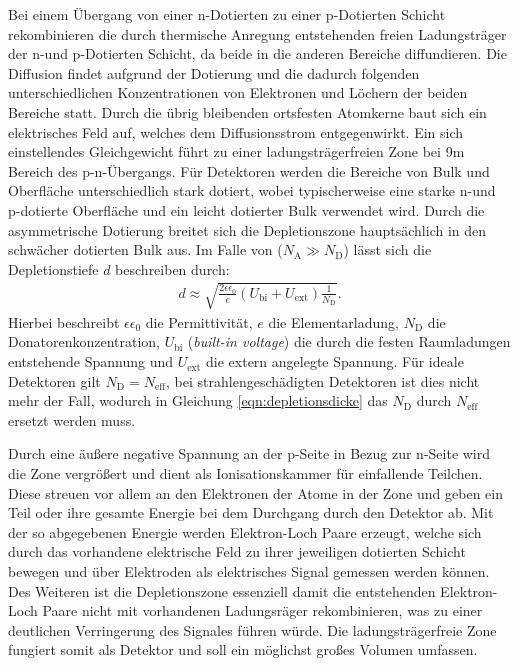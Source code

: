 Bei einem Übergang von einer n-Dotierten zu einer p-Dotierten Schicht rekombinieren die durch
thermische Anregung entstehenden freien Ladungsträger
der n-und p-Dotierten Schicht, da beide
in die anderen Bereiche diffundieren. Die Diffusion findet aufgrund der Dotierung und die dadurch folgenden unterschiedlichen
Konzentrationen von Elektronen und Löchern der beiden Bereiche statt.
Durch die übrig bleibenden ortsfesten Atomkerne
baut sich ein elektrisches Feld auf, welches dem Diffusionsstrom entgegenwirkt.
Ein sich einstellendes Gleichgewicht führt zu einer ladungsträgerfreien Zone bei
9m Bereich des p-n-Übergangs.
Für Detektoren werden die Bereiche von Bulk und Oberfläche unterschiedlich stark dotiert, wobei typischerweise eine starke n-und
p-dotierte Oberfläche und ein leicht dotierter Bulk verwendet wird. Durch die asymmetrische
Dotierung breitet sich die Depletionszone hauptsächlich in den schwächer dotierten Bulk aus.
Im Falle von ($N_{\mathrm{A}} \gg N_{\mathrm{D}}$) lässt sich die Depletionstiefe $d$ beschreiben durch:
\begin{align}
  d \approx \sqrt{\frac{2 \epsilon \epsilon_0}{e} (U_{\mathrm{bi}}+U_{\mathrm{ext}})\frac{1}{N_{\mathrm{D}}}}.
  \label{eqn:depletionsdicke}
\end{align}
Hierbei beschreibt $\epsilon \epsilon_0$ die Permittivität, $e$ die Elementarladung, $N_{\mathrm{D}}$ die Donatorenkonzentration, $U_{\mathrm{bi}}$ (\textit{built-in voltage})  die
durch die festen Raumladungen entstehende Spannung und $U_{\mathrm{ext}}$ die extern angelegte Spannung. Für ideale Detektoren gilt $N_{\mathrm{D}} = N_{\mathrm{eff}}$, bei
strahlengeschädigten Detektoren ist dies nicht mehr der Fall, wodurch in Gleichung \ref{eqn:depletionsdicke} das $N_{\mathrm{D}}$ durch $N_{\mathrm{eff}}$ ersetzt werden muss.


Durch eine äußere negative Spannung  an der p-Seite in Bezug zur n-Seite wird die Zone vergrößert und dient als Ionisationskammer für einfallende Teilchen. Diese streuen vor allem
an den Elektronen der Atome in der Zone und geben ein Teil oder ihre gesamte Energie bei dem Durchgang durch den Detektor ab. Mit der so abgegebenen
Energie werden Elektron-Loch Paare erzeugt, welche sich durch das vorhandene elektrische Feld zu ihrer jeweiligen dotierten
Schicht bewegen und über Elektroden als elektrisches Signal gemessen werden können. Des Weiteren ist die Depletionszone essenziell damit
die entstehenden Elektron-Loch Paare nicht mit vorhandenen Ladungsräger rekombinieren, was zu einer deutlichen Verringerung des Signales führen würde.
Die ladungsträgerfreie Zone fungiert somit als Detektor und soll ein möglichst großes Volumen umfassen.


